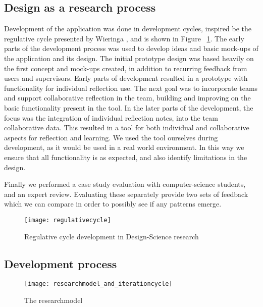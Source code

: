 \subsection{Design as a research process}
Development of the application was done in development cycles, inspired be the regulative cycle presented by Wieringa \citep{wieringa}, and is shown in Figure ~\ref{regulativecycle}. 
The early parts of the development process was used to develop ideas and basic mock-ups of the application and its design. The initial prototype design was based heavily on the first concept and mock-ups created, in addition to recurring feedback from users and supervisors. Early parts of development resulted in a prototype with functionality for individual reflection use. The next goal was to incorporate teams and support collaborative reflection in the team, building and improving on the basic functionality present in the tool. In the later parts of the development, the focus was the integration of individual reflection notes, into the team collaborative data. This resulted in a tool for both individual and collaborative aspects for reflection and learning. We used the tool ourselves during development, as it would be used in a real world environment. In this way we ensure that all functionality is as expected, and also identify limitations in the design. 

Finally we performed a case study evaluation with computer-science students, and an expert review. Evaluating these separately provide two sets of feedback which we can compare in order to possibly see if any patterns emerge. 
\begin{figure}[!htpb]
\centering
	\texttt{[image: regulativecycle]}
\caption{Regulative cycle development in Design-Science research}
\label{regulativecycle}
\end{figure}

\subsection{Development process}
\begin{figure}[!htpb]
\centering
	\texttt{[image: researchmodel\_and\_iterationcycle]}
\caption{The researchmodel}
\label{researchmodel}
\end{figure}

